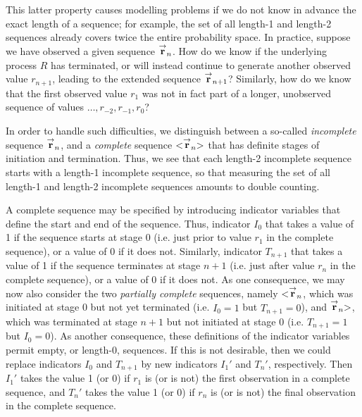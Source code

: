 \documentclass{report}
\begin{document}
This latter property causes modelling problems if we do not know in advance the exact length of
a sequence; for example, the set of all length-1 and length-2 sequences already
covers twice the entire probability space.
In practice,  suppose we have observed a given sequence 
$\stackrel{\rightarrow}{\bf r}_n$. How do we know if the
underlying process $R$ has terminated, or will instead
continue to generate another observed value
$r_{n+1}$, leading to the extended sequence
$\stackrel{\rightarrow}{\bf r}_{n+1}$? 
Similarly, how do we know that the first observed value $r_1$ was not in fact
part of a longer, unobserved sequence of values $\ldots,r_{-2},r_{-1},r_0$?

In order to handle such difficulties, we distinguish between a so-called
{\em incomplete} sequence $\stackrel{\rightarrow}{\bf r}_n$, and a {\em complete}
sequence $<\stackrel{\rightarrow}{\bf r}_n>$ that has definite stages of
initiation and termination. 
Thus, we see that each length-2 incomplete sequence starts with a length-1 incomplete
sequence, so that measuring the set of all length-1 and length-2 incomplete sequences
amounts to double counting.

A complete sequence may be specified by introducing indicator variables
that define the start and end of the sequence.
Thus, indicator $I_0$ that takes a value of 1 if the sequence
starts at stage 0 (i.e. just prior to value $r_1$ in the complete sequence), 
or a value of 0 if it does not.
Similarly, indicator $T_{n+1}$ that takes a value of 1 if the
sequence terminates at stage $n+1$ (i.e. just after value $r_n$ in the complete sequence), or a value of 0 if it does not.
As one consequence, we may now also consider the two {\em partially complete} sequences, namely
$<\stackrel{\rightarrow}{\bf r}_n$, which was initiated at stage 0 but not yet terminated
(i.e. $I_0=1$ but $T_{n+1}=0$),
and $\stackrel{\rightarrow}{\bf r}_n>$, which was terminated at stage $n+1$ but not
initiated at stage 0 (i.e. $T_{n+1}=1$ but $I_0=0$).
As another consequence, these definitions of the indicator variables permit empty, or
length-0, sequences. If this is not desirable, then we could replace indicators
$I_0$ and $T_{n+1}$ by new indicators $I_{1}'$ and $T_{n}'$, respectively.
Then $I_{1}'$ takes the value 1 (or 0) if $r_1$ is (or is not) the first observation in a
complete sequence, and $T_{n}'$ takes the value 1 (or 0) if $r_n$ is
(or is not) the final observation in the complete sequence.
\end{document}
